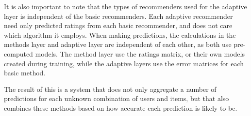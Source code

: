 It is also important to note that the types of recommenders used for the adaptive layer
is independent of the basic recommenders.
Each adaptive recommender need only predicted ratings from each basic recommender,
and does not care which algorithm it employs.
When making predictions, the calculations in the methods layer and adaptive layer
are independent of each other, as both use pre-computed models.
The method layer use the ratings matrix, or their own models
created during training, while the adaptive layers use the error matrices for each
basic method.

The result of this is a system that does not only aggregate a number of predictions for each unknown
combination of users and items,
but that also combines these methods based on how accurate each prediction is likely to be.



